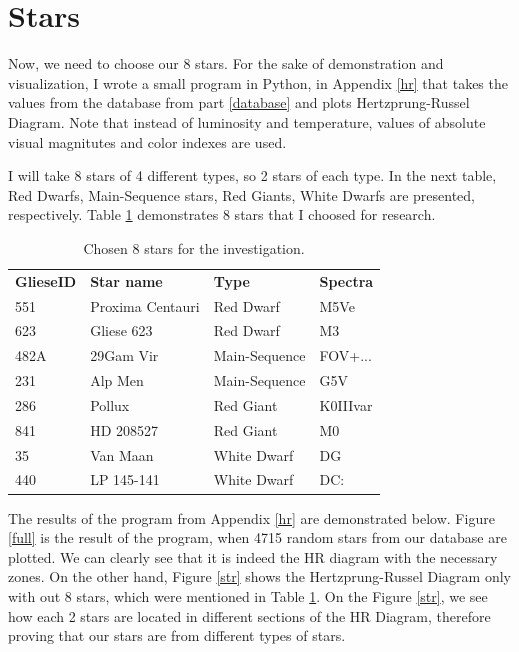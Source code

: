 \documentclass[a4paper,12pt]{article}
\begin{document}
  \newpage
  \section{Stars}

  Now, we need to choose our 8 stars. For the sake of demonstration and visualization, I wrote a small program in Python, in Appendix \ref{hr} that takes the values from the database from part \ref{database} and plots Hertzprung-Russel Diagram. Note that instead of luminosity and temperature, values of absolute visual magnitutes and color indexes are used.

  I will take 8 stars of 4 different types, so 2 stars of each type. In the next table, Red Dwarfs, Main-Sequence stars, Red Giants, White Dwarfs are presented, respectively. Table \ref{stars} demonstrates 8 stars that I choosed for research.

  \begin{table}[h!]
    \begin{center}
    \caption{Chosen 8 stars for the investigation.}
    \begin{tabular}{l | l | l | l}
      \textbf{GlieseID} & \textbf{Star name} & \textbf{Type} & \textbf{Spectra}\\
      551 & Proxima Centauri & Red Dwarf & M5Ve\\
      623 & Gliese 623 & Red Dwarf & M3\\
      482A & 29Gam Vir & Main-Sequence & FOV+...\\
      231 & Alp Men & Main-Sequence & G5V\\
      286 & Pollux & Red Giant & K0IIIvar\\
      841 & HD 208527 & Red Giant & M0\\
      35 & Van Maan & White Dwarf & DG\\
      440 & LP 145-141 & White Dwarf & DC:\\
    \end{tabular}
    \label{stars}
  \end{center}
    \end{table}

The results of the program from Appendix \ref{hr} are demonstrated below. Figure \ref{full} is the result of the program, when 4715 random stars from our database are plotted. We can clearly see that it is indeed the HR diagram with the necessary zones. On the other hand, Figure \ref{str} shows the Hertzprung-Russel Diagram only with out 8 stars, which were mentioned in Table \ref{stars}. On the Figure \ref{str}, we see how each 2 stars are located in different sections of the HR Diagram, therefore proving that our stars are from different types of stars. 
  
\end{document}
